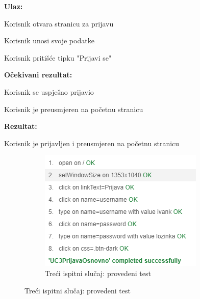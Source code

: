  			\noindent {}
 			\begin{packed_item}
 				
 				\item  \textbf{Ulaz:}
 				
 				\item[] \begin{packed_enum}
 					
 					\item Korisnik otvara stranicu za prijavu
 					\item Korisnik unosi svoje podatke
 					\item Korisnik pritišće tipku "Prijavi se"
 					
 				\end{packed_enum}
 				
 				\item \textbf{Očekivani rezultat:}
 				
 				\item[] \begin{packed_enum}
 					
 					\item Korisnik se uspješno prijavio
 					\item Korisnik je preusmjeren na početnu stranicu
 					
 				\end{packed_enum}		
 				
 				\item \textbf{Rezultat:} 
 				
 					\begin{packed_enum}
 						
 						\item Korisnik je prijavljen i preusmjeren na početnu stranicu
 						
 					\end{packed_enum}
 						
 				
 			\end{packed_item}
 			
 			\begin{figure}[H]
 				\begin{subfigure}{0.5\textwidth}
 					\centering
 					\includegraphics[scale=0.7]{slike/test3.png}
 					\caption{Treći ispitni slučaj: provedeni test}
 					\label{fig:treciIspitniSlucajTest}
 				\end{subfigure}%
 			
 			\end{figure}
 		
